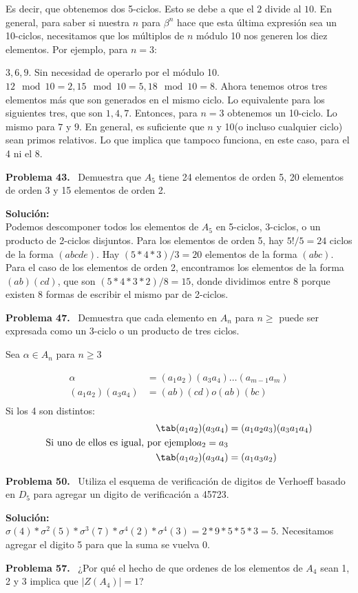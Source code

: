 \documentclass{article}
\newcounter{problem}
\newcounter{solution}
\newcommand\Problem[1]{%
  \stepcounter{problem}%
  \textbf{Problema #1.}~%
  \setcounter{solution}{0}%
}
\newcommand\TheSolution{%
  \textbf{Solución:}\\%
}
\begin{document}
Es decir, que obtenemos dos 5-ciclos. Esto se debe a que el $2$ divide al
$10$. En general, para saber si nuestra $n$ para $\beta ^{n}$ hace que esta
última expresión sea un 10-ciclos, necesitamos que los múltiplos de $n$ módulo
10 nos generen los diez elementos. Por ejemplo, para $n=3$:

$3,6,9$. Sin necesidad de operarlo por el módulo 10.
$12\mod10=2,15\mod10=5,18\mod10=8$. Ahora tenemos otros tres elementos más que
son generados en el mismo ciclo. Lo equivalente para los siguientes tres, que
son $1,4,7$. Entonces, para $n=3$ obtenemos un 10-ciclo. Lo mismo para $7$ y
$9$. En general, es suficiente que $n$ y 10(o incluso cualquier ciclo) sean
primos relativos. Lo que implica que tampoco funciona, en este caso, para el 4
ni el 8.

\Problem{43} Demuestra que $A_5$ tiene 24 elementos de orden 5, 20 elementos
de orden 3 y 15 elementos de orden 2.

\TheSolution{} Podemos descomponer todos los elementos de $A_5$ en 5-ciclos,
3-ciclos, o un producto de 2-ciclos disjuntos. Para los elementos de orden 5,
hay $5! / 5 = 24$ ciclos de la forma $(abcde)$. Hay $(5 * 4 * 3) / 3 = 20$
elementos de la forma $(abc)$. Para el caso de los elementos de orden 2,
encontramos los elementos de la forma $(ab)(cd)$, que son $(5 * 4 * 3 * 2)/8
= 15$, donde dividimos entre 8 porque existen 8 formas de escribir el mismo
par de 2-ciclos.

\Problem{47} Demuestra que cada elemento en $A_n$ para $n \geq$ puede ser
expresada como un 3-ciclo o un producto de tres ciclos.

Sea $\alpha \in A_n$ para $n \geq 3$

\[
\begin{split}
  \alpha           &= (a_1a_2)(a_3a_4)\dots(a_{m-1}a_m) \\
  (a_1a_2)(a_3a_4) &= (ab)(cd) o (ab)(bc) \\
\end{split}
\]
Si los 4 son distintos:
\[
\begin{split}
  \tab (a_1a_2) (a_3a_4) &= (a_1a_2a_3) (a_3a_1a_4)\\
  \text{Si uno de ellos es igual, por ejemplo} a_2 = a_3\\
  \tab (a_1a_2) (a_3a_4) &= (a_1a_3a_2)
\end{split}
\]

\Problem{50} Utiliza el esquema de verificación de digitos de Verhoeff basado
en $D_5$ para agregar un digito de verificación a 45723.

\TheSolution{} $\sigma(4) * \sigma^{2}(5) * \sigma^{3}(7) * \sigma^{4}(2) *
\sigma^{4}(3) = 2 * 9 * 5 * 5 * 3 = 5$. Necesitamos agregar el digito 5 para
que la suma se vuelva 0.

\Problem{57} ¿Por qué el hecho de que ordenes de los elementos de $A_4$ sean
1, 2 y 3 implica que $|Z(A_4)| = 1$?
\end{document}
